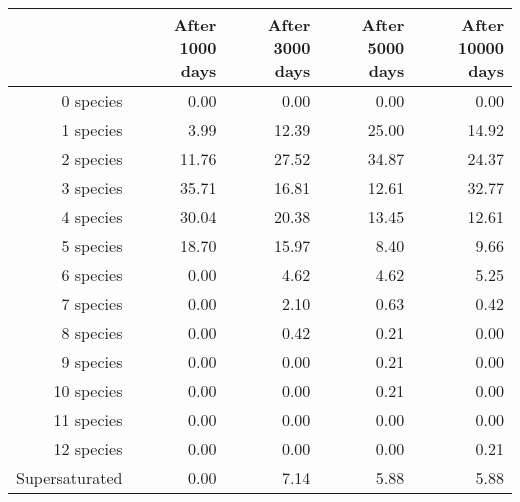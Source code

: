 \begin{table}[ht]
\centering
\begin{tabular}{rrrrr}
  \hline
 & After 1000 days & After 3000 days & After 5000 days & After 10000 days \\ 
  \hline
0 species & 0.00 & 0.00 & 0.00 & 0.00 \\ 
  1 species & 3.99 & 12.39 & 25.00 & 14.92 \\ 
  2 species & 11.76 & 27.52 & 34.87 & 24.37 \\ 
  3 species & 35.71 & 16.81 & 12.61 & 32.77 \\ 
  4 species & 30.04 & 20.38 & 13.45 & 12.61 \\ 
  5 species & 18.70 & 15.97 & 8.40 & 9.66 \\ 
  6 species & 0.00 & 4.62 & 4.62 & 5.25 \\ 
  7 species & 0.00 & 2.10 & 0.63 & 0.42 \\ 
  8 species & 0.00 & 0.42 & 0.21 & 0.00 \\ 
  9 species & 0.00 & 0.00 & 0.21 & 0.00 \\ 
  10 species & 0.00 & 0.00 & 0.21 & 0.00 \\ 
  11 species & 0.00 & 0.00 & 0.00 & 0.00 \\ 
  12 species & 0.00 & 0.00 & 0.00 & 0.21 \\ 
  Supersaturated & 0.00 & 7.14 & 5.88 & 5.88 \\ 
   \hline
\end{tabular}
\end{table}
